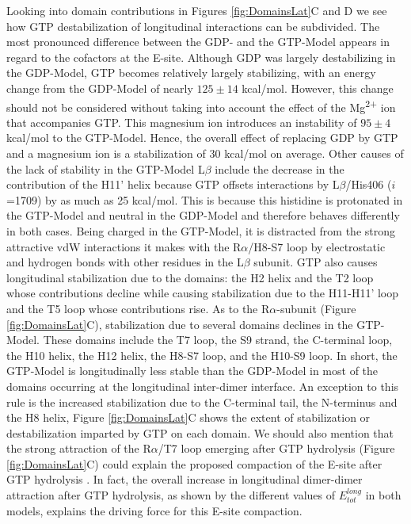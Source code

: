 \documentclass[11pt]{report}
\begin{document}
Looking into domain contributions in Figures \ref{fig:DomainsLat}C and
D we see how GTP destabilization of longitudinal interactions
can be subdivided. The most pronounced difference between the GDP- and the
GTP-Model appears in regard to the cofactors at the E-site. Although GDP was largely destabilizing 
in the GDP-Model, GTP becomes relatively largely stabilizing,
with an energy change from the GDP-Model of nearly $125\pm14$ kcal/mol.
However, this change should not be considered without taking into account the
effect of the Mg\textsuperscript{2+} ion that accompanies GTP.
This magnesium ion introduces an instability of $95\pm4$ kcal/mol to the GTP-Model.
Hence, the overall effect of replacing GDP by GTP and a magnesium ion is
a stabilization of 30 kcal/mol
on average.
Other causes of the lack of stability in the GTP-Model L$\beta$
include the decrease in the contribution of the
H11' helix because GTP offsets interactions by
L$\beta$/His406 ($i$=1709) by as much as 25 kcal/mol. This is because
this histidine is protonated in the GTP-Model and neutral in
the GDP-Model and therefore behaves differently in both cases. Being charged in the
GTP-Model, it is distracted from the strong attractive vdW interactions it makes
with the R$\alpha$/H8-S7 loop by electrostatic and hydrogen bonds with other
residues in the L$\beta$ subunit.
GTP also causes longitudinal stabilization due to the domains: the H2 helix and the T2 loop 
whose contributions decline while causing stabilization due to the
H11-H11' loop and the T5 loop whose contributions rise. 
As to the R$\alpha$-subunit (Figure \ref{fig:DomainsLat}C),
stabilization due to several domains declines in the GTP-Model.
These domains include the T7 loop, the S9 strand, the C-terminal loop,
the H10 helix, the H12 helix, the H8-S7 loop, and the H10-S9 loop. In short,
the GTP-Model is longitudinally less stable than the GDP-Model in most of the 
domains occurring at the longitudinal inter-dimer interface. An exception to this rule
is the increased stabilization due to the C-terminal tail, the N-terminus
and the H8 helix, Figure \ref{fig:DomainsLat}C shows the extent of
stabilization or destabilization imparted by GTP on each domain.
We should also mention that the strong attraction of the R$\alpha$/T7
loop emerging after GTP hydrolysis (Figure \ref{fig:DomainsLat}C) could explain the proposed compaction
of the E-site after GTP hydrolysis \cite{Alushin2014}. In fact,
the overall increase in longitudinal dimer-dimer
attraction after GTP
hydrolysis, as shown by the different values of 
 $E_{tot}^{long}$ in both models, explains the driving 
force for this E-site compaction.
\end{document}
